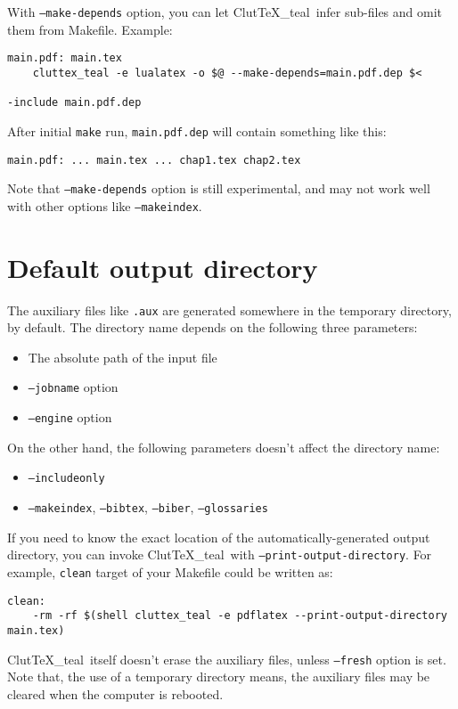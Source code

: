 \documentclass[a4paper]{report}
\newcommand\ClutTeX{Clut\TeX\_teal}
\begin{document}
With \texttt{--make-depends} option, you can let \ClutTeX\ infer sub-files and omit them from Makefile.
Example:

\begin{verbatim}
main.pdf: main.tex
    cluttex_teal -e lualatex -o $@ --make-depends=main.pdf.dep $<

-include main.pdf.dep
\end{verbatim}

After initial \texttt{make} run, \texttt{main.pdf.dep} will contain something like this:
\begin{verbatim}
main.pdf: ... main.tex ... chap1.tex chap2.tex
\end{verbatim}

Note that \texttt{--make-depends} option is still experimental, and may not work well with other options like \texttt{--makeindex}.

\section{Default output directory}
The auxiliary files like \texttt{.aux} are generated somewhere in the temporary directory, by default.
The directory name depends on the following three parameters:
\begin{itemize}
\item The absolute path of the input file
\item \texttt{--jobname} option
\item \texttt{--engine} option
\end{itemize}
On the other hand, the following parameters doesn't affect the directory name:
\begin{itemize}
\item \texttt{--includeonly}
\item \texttt{--makeindex}, \texttt{--bibtex}, \texttt{--biber}, \texttt{--glossaries}
\end{itemize}

If you need to know the exact location of the automatically-generated output directory, you can invoke \ClutTeX\ with \texttt{--print-output-directory}.
For example, \texttt{clean} target of your Makefile could be written as:
\begin{verbatim}
clean:
    -rm -rf $(shell cluttex_teal -e pdflatex --print-output-directory main.tex)
\end{verbatim}

\ClutTeX\ itself doesn't erase the auxiliary files, unless \texttt{--fresh} option is set.
Note that, the use of a temporary directory means, the auxiliary files may be cleared when the computer is rebooted.
\end{document}
